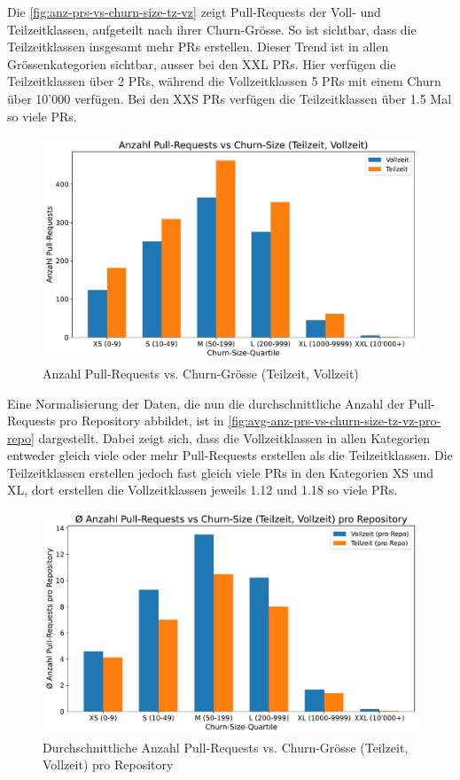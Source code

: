Die \autoref{fig:anz-prs-vs-churn-size-tz-vz} zeigt Pull-Requests der Voll- und Teilzeitklassen, aufgeteilt nach ihrer Churn-Grösse. So ist sichtbar, dass die Teilzeitklassen insgesamt mehr PRs erstellen. Dieser Trend ist in allen Grössenkategorien sichtbar, ausser bei den XXL PRs. Hier verfügen die Teilzeitklassen  über 2 PRs, während die Vollzeitklassen 5 PRs mit einem Churn über 10'000 verfügen. Bei den XXS PRs verfügen die Teilzeitklassen über 1.5 Mal so viele PRs.

\begin{figure}[htbp]
    \includegraphics[width=\textwidth]{Figures/anz-prs-vs-churn-size-tz-vz.pdf}
    \caption{Anzahl Pull-Requests vs. Churn-Grösse (Teilzeit, Vollzeit)}
    \label{fig:anz-prs-vs-churn-size-tz-vz}
\end{figure}

Eine Normalisierung der Daten, die nun die durchschnittliche Anzahl der Pull-Requests pro Repository abbildet, ist in \autoref{fig:avg-anz-prs-vs-churn-size-tz-vz-pro-repo} dargestellt. Dabei zeigt sich, dass die Vollzeitklassen in allen Kategorien entweder gleich viele oder mehr Pull-Requests erstellen als die Teilzeitklassen. Die Teilzeitklassen erstellen jedoch fast gleich viele PRs in den Kategorien XS und XL, dort erstellen die Vollzeitklassen jeweils 1.12 und 1.18 so viele PRs. 

\begin{figure}[htbp]
    \includegraphics[width=\textwidth]{Figures/avg-anz-prs-vs-churn-size-tz-vz-pro-repo.pdf}
    \caption{Durchschnittliche Anzahl Pull-Requests vs. Churn-Grösse (Teilzeit, Vollzeit) pro Repository}
    \label{fig:avg-anz-prs-vs-churn-size-tz-vz-pro-repo}
\end{figure}


